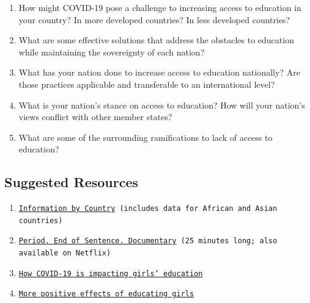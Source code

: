 \documentclass[10pt, letterpaper]{article}
\begin{document}
\begin{enumerate}
\def\labelenumi{\arabic{enumi}.}
\item
  
  How might COVID-19 pose a challenge to increasing access to education
  in your country? In more developed countries? In less developed
  countries?
  
\item
  
  What are some effective solutions that address the obstacles to
  education while maintaining the sovereignty of each nation?
  
\item
  
  What has your nation done to increase access to education nationally?
  Are those practices applicable and transferable to an international
  level?
  
\item
  
  What is your nation's stance on access to education? How will your
  nation's views conflict with other member states?
  
\item
  
  What are some of the surrounding ramifications to lack of access to
  education?
  
\end{enumerate}

\subsection{Suggested Resources}

\begin{enumerate}
\def\labelenumi{\arabic{enumi}.}
\item
  
  \texttt{\href{http://www.ungei.org/infobycountry/index.html}{{Information
  by Country}} (includes data for African and Asian countries)}
  
\item
  
  \texttt{\href{https://www.youtube.com/watch?v=Lrm2pD0qofM\&ab_channel=Netflix}{{Period.
  End of Sentence. Documentary}} (25 minutes long; also available on
  Netflix)}
  
\item
  
  \texttt{\href{https://www.girlsnotbrides.org/educating-girls-during-covid-19/}{{How
  COVID-19 is impacting girls' education}}}
  
\item
  
  \texttt{\href{http://maasaigirlseducation.org/five-things-that-happen-when-you-educate-a-girl/}{{More
  positive effects of educating girls}}}
  
\end{enumerate}
\end{document}
